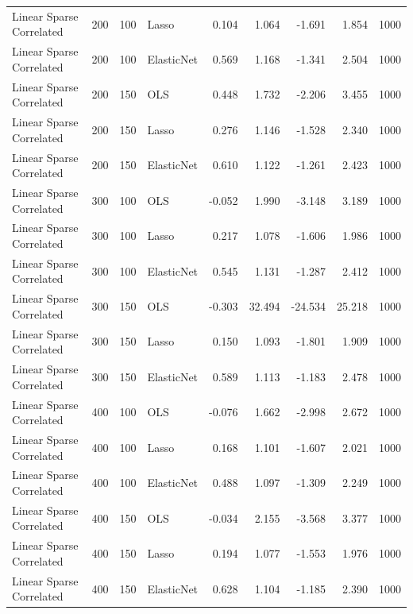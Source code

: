 \begin{table}[!htbp]
\begin{tabular}{l r r l r r r r r}
Linear Sparse Correlated & 200 & 100 & Lasso & 0.104 & 1.064 & -1.691 & 1.854 & 1000 \\
Linear Sparse Correlated & 200 & 100 & ElasticNet & 0.569 & 1.168 & -1.341 & 2.504 & 1000 \\
Linear Sparse Correlated & 200 & 150 & OLS & 0.448 & 1.732 & -2.206 & 3.455 & 1000 \\
Linear Sparse Correlated & 200 & 150 & Lasso & 0.276 & 1.146 & -1.528 & 2.340 & 1000 \\
Linear Sparse Correlated & 200 & 150 & ElasticNet & 0.610 & 1.122 & -1.261 & 2.423 & 1000 \\
Linear Sparse Correlated & 300 & 100 & OLS & -0.052 & 1.990 & -3.148 & 3.189 & 1000 \\
Linear Sparse Correlated & 300 & 100 & Lasso & 0.217 & 1.078 & -1.606 & 1.986 & 1000 \\
Linear Sparse Correlated & 300 & 100 & ElasticNet & 0.545 & 1.131 & -1.287 & 2.412 & 1000 \\
Linear Sparse Correlated & 300 & 150 & OLS & -0.303 & 32.494 & -24.534 & 25.218 & 1000 \\
Linear Sparse Correlated & 300 & 150 & Lasso & 0.150 & 1.093 & -1.801 & 1.909 & 1000 \\
Linear Sparse Correlated & 300 & 150 & ElasticNet & 0.589 & 1.113 & -1.183 & 2.478 & 1000 \\
Linear Sparse Correlated & 400 & 100 & OLS & -0.076 & 1.662 & -2.998 & 2.672 & 1000 \\
Linear Sparse Correlated & 400 & 100 & Lasso & 0.168 & 1.101 & -1.607 & 2.021 & 1000 \\
Linear Sparse Correlated & 400 & 100 & ElasticNet & 0.488 & 1.097 & -1.309 & 2.249 & 1000 \\
Linear Sparse Correlated & 400 & 150 & OLS & -0.034 & 2.155 & -3.568 & 3.377 & 1000 \\
Linear Sparse Correlated & 400 & 150 & Lasso & 0.194 & 1.077 & -1.553 & 1.976 & 1000 \\
Linear Sparse Correlated & 400 & 150 & ElasticNet & 0.628 & 1.104 & -1.185 & 2.390 & 1000 \\
 \hline
\end{tabular}
\end{table}


